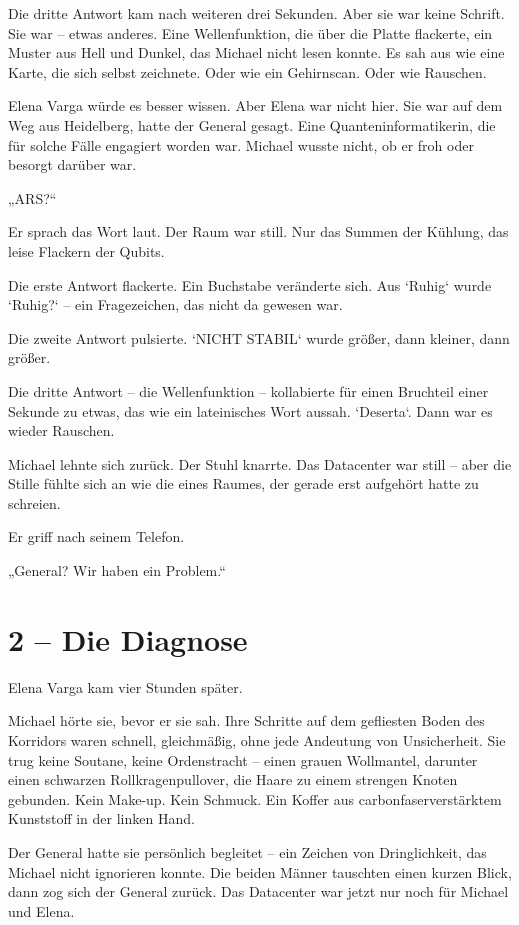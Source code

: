 \documentclass[
]{article}
\begin{document}
Die dritte Antwort kam nach weiteren drei Sekunden. Aber sie war keine Schrift. Sie war -- etwas anderes. Eine Wellenfunktion, die über die Platte flackerte, ein Muster aus Hell und Dunkel, das Michael nicht lesen konnte. Es sah aus wie eine Karte, die sich selbst zeichnete. Oder wie ein Gehirnscan. Oder wie Rauschen.

Elena Varga würde es besser wissen. Aber Elena war nicht hier. Sie war auf dem Weg aus Heidelberg, hatte der General gesagt. Eine Quanteninformatikerin, die für solche Fälle engagiert worden war. Michael wusste nicht, ob er froh oder besorgt darüber war.

„ARS?{\kern0pt}``

Er sprach das Wort laut. Der Raum war still. Nur das Summen der Kühlung, das leise Flackern der Qubits.

Die erste Antwort flackerte. Ein Buchstabe veränderte sich. Aus `Ruhig` wurde `Ruhig?{\kern0pt}` -- ein Fragezeichen, das nicht da gewesen war.

Die zweite Antwort pulsierte. `NICHT STABIL` wurde größer, dann kleiner, dann größer.

Die dritte Antwort -- die Wellenfunktion -- kollabierte für einen Bruchteil einer Sekunde zu etwas, das wie ein lateinisches Wort aussah. `Deserta`. Dann war es wieder Rauschen.

Michael lehnte sich zurück. Der Stuhl knarrte. Das Datacenter war still -- aber die Stille fühlte sich an wie die eines Raumes, der gerade erst aufgehört hatte zu schreien.

Er griff nach seinem Telefon.

„General? Wir haben ein Problem.``

\section{2 -- Die Diagnose}\label{die-diagnose}

Elena Varga kam vier Stunden später.

Michael hörte sie, bevor er sie sah. Ihre Schritte auf dem gefliesten Boden des Korridors waren schnell, gleichmäßig, ohne jede Andeutung von Unsicherheit. Sie trug keine Soutane, keine Ordenstracht -- einen grauen Wollmantel, darunter einen schwarzen Rollkragenpullover, die Haare zu einem strengen Knoten gebunden. Kein Make-up. Kein Schmuck. Ein Koffer aus carbonfaserverstärktem Kunststoff in der linken Hand.

Der General hatte sie persönlich begleitet -- ein Zeichen von Dringlichkeit, das Michael nicht ignorieren konnte. Die beiden Männer tauschten einen kurzen Blick, dann zog sich der General zurück. Das Datacenter war jetzt nur noch für Michael und Elena.
\end{document}
